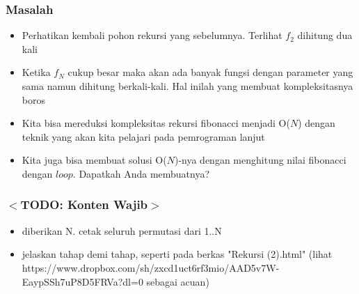 \begin{frame}
\frametitle{Masalah}
\begin{itemize}
  \item Perhatikan kembali pohon rekursi yang sebelumnya. Terlihat $f_2$ dihitung dua kali
  \item Ketika $f_N$ cukup besar maka akan ada banyak fungsi dengan parameter yang sama namun dihitung berkali-kali. Hal inilah yang membuat kompleksitasnya boros
  \item Kita bisa mereduksi kompleksitas rekursi fibonacci menjadi O($N$) dengan teknik yang akan kita pelajari pada pemrograman lanjut
  \item Kita juga bisa membuat solusi O($N$)-nya dengan menghitung nilai fibonacci dengan $loop$. Dapatkah Anda membuatnya?
\end{itemize}
\end{frame}

\begin{frame}
\frametitle{$<$TODO: Konten Wajib$>$}
\begin{itemize}
  \item diberikan N. cetak seluruh permutasi dari 1..N
  \item jelaskan tahap demi tahap, seperti pada berkas "Rekursi (2).html" (lihat  https://www.dropbox.com/sh/zxcd1uct6rf3mio/AAD5v7W-EaypSSh7uP8D5FRVa?dl=0 sebagai acuan)
\end{itemize}
\end{frame}


